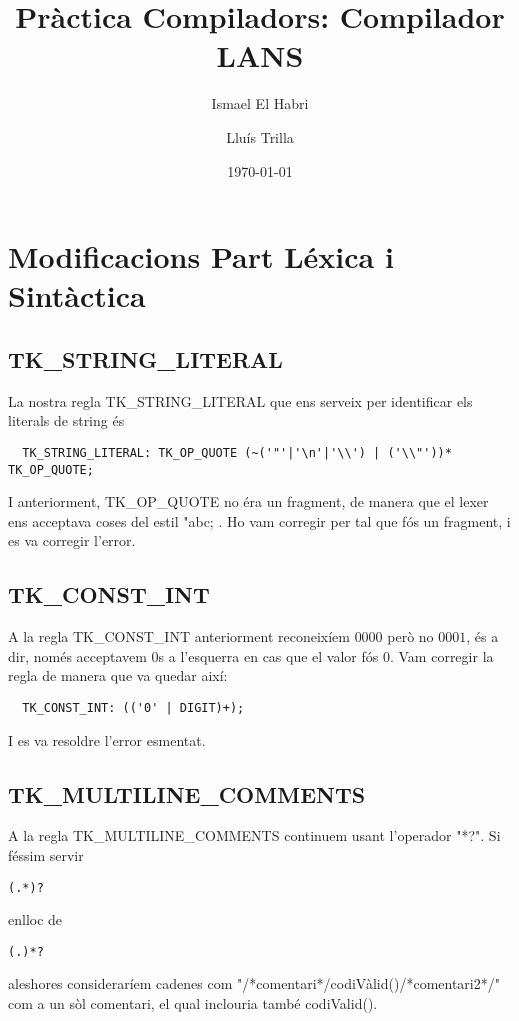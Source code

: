 \documentclass[11pt,a4paper,twoside]{article}
\title{Pràctica Compiladors: Compilador LANS}
\author{Ismael El Habri
	\and 
	Lluís Trilla
	}
\date{\today}
\begin{document}
\maketitle

\section{Modificacions Part Léxica i Sintàctica}

\subsection{TK\_STRING\_LITERAL}

La nostra regla TK\_STRING\_LITERAL que ens serveix per identificar els literals de string és
\begin{lstlisting}
  TK_STRING_LITERAL: TK_OP_QUOTE (~('"'|'\n'|'\\') | ('\\"'))* TK_OP_QUOTE;
\end{lstlisting}
I anteriorment, TK\_OP\_QUOTE no éra un fragment, de manera que el lexer ens acceptava coses del estil "abc; . Ho vam corregir per tal que fós un fragment, i es va corregir l'error.

\subsection{TK\_CONST\_INT}
A la regla TK\_CONST\_INT anteriorment reconeixíem $0000$ però no $0001$, és a dir, només acceptavem 0s a l'esquerra en cas que el valor fós 0. Vam corregir la regla de manera que va quedar així:
\begin{lstlisting}
  TK_CONST_INT: (('0' | DIGIT)+);
\end{lstlisting}
I es va resoldre l'error esmentat.

\subsection{TK\_MULTILINE\_COMMENTS}
A la regla TK\_MULTILINE\_COMMENTS continuem usant l'operador "*?". Si féssim servir
\begin{lstlisting}
(.*)?
\end{lstlisting}
  enlloc de
\begin{lstlisting}
(.)*?
\end{lstlisting}
    aleshores consideraríem cadenes com "/*comentari*/codiVàlid()/*comentari2*/"$ $
    com a un sòl comentari, el qual inclouria també codiValid().
\end{document}
